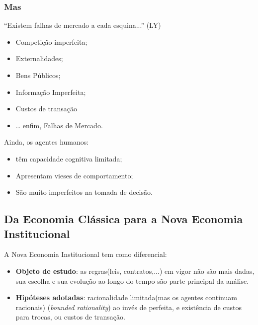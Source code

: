\documentclass[a4paper,12pt]{article}[abntex2]
\begin{document}
\subsubsection{\textbf{Mas}}
“Existem falhas de mercado a cada esquina...” (LY)\begin{itemize}
    \item Competição imperfeita;
    \item Externalidades;
    \item Bens Públicos;
    \item Informação Imperfeita;
    \item Custos de transação
    \item … enfim, Falhas de Mercado.
\end{itemize}

Ainda, os agentes humanos:\begin{itemize}
    \item têm capacidade cognitiva limitada; 
    \item Apresentam vieses de comportamento;
    \item São muito imperfeitos na tomada de decisão. 
\end{itemize}

\subsection{\textbf{Da Economia Clássica para a Nova Economia Institucional}}
A Nova Economia Institucional tem como diferencial:\begin{itemize}
    \item \textbf{Objeto de estudo}: as regras(leis, contratos,...) em vigor não são mais dadas, sua escolha e sua evolução ao longo do tempo são parte principal da análise.
    \item \textbf{Hipóteses adotadas}: racionalidade limitada(mas os agentes continuam racionais) (\textit{bounded rationality}) ao invés de perfeita, e existência de custos para trocas, ou custos de transação.
\end{itemize}
\end{document}

